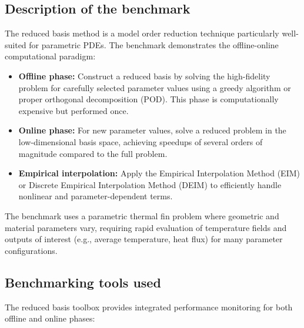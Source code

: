 \subsection{Description of the benchmark}

The reduced basis method is a model order reduction technique particularly well-suited for parametric PDEs. The benchmark demonstrates the offline-online computational paradigm:

\begin{itemize}
\item \textbf{Offline phase:} Construct a reduced basis by solving the high-fidelity problem for carefully selected parameter values using a greedy algorithm or proper orthogonal decomposition (POD). This phase is computationally expensive but performed once.

\item \textbf{Online phase:} For new parameter values, solve a reduced problem in the low-dimensional basis space, achieving speedups of several orders of magnitude compared to the full problem.

\item \textbf{Empirical interpolation:} Apply the Empirical Interpolation Method (EIM) or Discrete Empirical Interpolation Method (DEIM) to efficiently handle nonlinear and parameter-dependent terms.
\end{itemize}

The benchmark uses a parametric thermal fin problem where geometric and material parameters vary, requiring rapid evaluation of temperature fields and outputs of interest (e.g., average temperature, heat flux) for many parameter configurations.



\subsection{Benchmarking tools used}

The \Feelpp reduced basis toolbox provides integrated performance monitoring for both offline and online phases:

